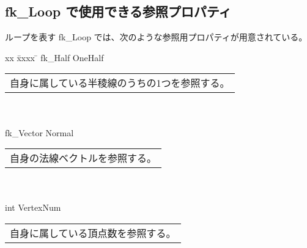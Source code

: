 \subsection{fk\_Loop で使用できる参照プロパティ}
ループを表す fk\_Loop では、次のような参照用プロパティが用意されている。
\begin{tabbing}
xx \= xxxx \= \kill
\> fk\_Half OneHalf \\
	\> \> \begin{tabular}{p{15cm}}
		自身に属している半稜線のうちの1つを参照する。
	\end{tabular} \\ \\

\> fk\_Vector Normal \\
	\> \> \begin{tabular}{p{15cm}}
		自身の法線ベクトルを参照する。
	\end{tabular} \\ \\

\> int VertexNum \\
	\> \> \begin{tabular}{p{15cm}}
		自身に属している頂点数を参照する。
	\end{tabular}
\end{tabbing}

